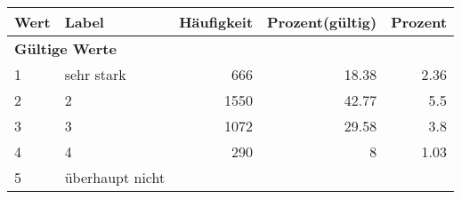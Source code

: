      \begin{longtable}{lXrrr}
     \toprule
     \textbf{Wert} & \textbf{Label} & \textbf{Häufigkeit} & \textbf{Prozent(gültig)} & \textbf{Prozent} \\
     \endhead
     \midrule
     \multicolumn{5}{l}{\textbf{Gültige Werte}}\\

     1 &
     \multicolumn{1}{X}{ sehr stark   } &


       \num{666} &
       \num[round-mode=places,round-precision=2]{18.38} &
         \num[round-mode=places,round-precision=2]{2.36} \\

     2 &
     \multicolumn{1}{X}{ 2   } &


       \num{1550} &
       \num[round-mode=places,round-precision=2]{42.77} &
         \num[round-mode=places,round-precision=2]{5.5} \\

     3 &
     \multicolumn{1}{X}{ 3   } &


       \num{1072} &
       \num[round-mode=places,round-precision=2]{29.58} &
         \num[round-mode=places,round-precision=2]{3.8} \\

     4 &
     \multicolumn{1}{X}{ 4   } &


       \num{290} &
       \num[round-mode=places,round-precision=2]{8} &
         \num[round-mode=places,round-precision=2]{1.03} \\

     5 &
     \multicolumn{1}{X}{ überhaupt nicht   } &



\end{longtable}
